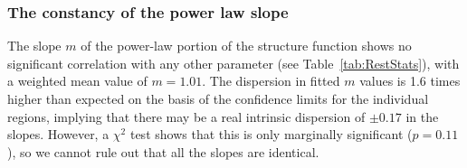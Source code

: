 \documentclass[fleqn,usenatbib, useAMS, a4paper]{mnras}
\newcounter{ionstage}
\renewcommand{\ion}[2]{\setcounter{ionstage}{#2}%
  \ensuremath{\mathrm{#1\,\scriptstyle\Roman{ionstage}}}}
\newcommand\hii{\ion{H}{2}}
\begin{document}




\subsubsection{The constancy of the power law slope}
\label{sec:constancy-power-law}
The slope \(m\) of the power-law portion of the structure function
shows no significant correlation with any other parameter
(see Table~\ref{tab:RestStats}),
with a weighted mean value of \(m = 1.01\).
The dispersion in fitted \(m\) values is 1.6 times higher than expected
on the basis of the confidence limits for the individual regions,
implying that there may be a real intrinsic dispersion of \(\pm 0.17\) in the slopes.
However, a \(\chi^2\) test shows that this is only marginally significant
(\(p = 0.11\)), so we cannot rule out that all the slopes are identical.
\end{document}

